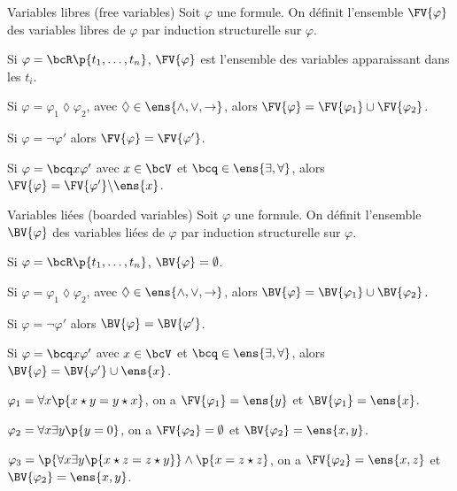     \begin{definition}{Variables libres (free variables)}{}
        Soit $\varphi$ une formule. On définit l'ensemble $\FV{\varphi}$ des variables libres de $\varphi$ par induction structurelle sur $\varphi$.
        
        \begin{enumerate}
            \itast Si $\varphi = \bcR\p{t_1, \dots, t_n}$, $\FV{\varphi}$ est l'ensemble des variables apparaissant dans les $t_i$.
            
            \itast Si $\varphi = \varphi_1 \lozenge \varphi_2$, avec $\lozenge \in \ens{\land, \lor, \rightarrow}$, alors $\FV{\varphi} = \FV{\varphi_1} \cup \FV{\varphi_2}$.
            
            \itast Si $\varphi = \neg \varphi'$ alors $\FV{\varphi} = \FV{\varphi'}$.
            
            \itast Si $\varphi = \bcq x \varphi'$ avec $x \in \bcV$ et $\bcq \in \ens{\exists, \forall}$, alors $\FV{\varphi} = \FV{\varphi'} \backslash \ens{x}$. 
        \end{enumerate}
    \end{definition}
    
        \begin{definition}{Variables liées (boarded variables)}{}
        Soit $\varphi$ une formule. On définit l'ensemble $\BV{\varphi}$ des variables liées de $\varphi$ par induction structurelle sur $\varphi$.
        
        \begin{enumerate}
            \itast Si $\varphi = \bcR\p{t_1, \dots, t_n}$, $\BV{\varphi} = \emptyset$.
            
            \itast Si $\varphi = \varphi_1 \lozenge \varphi_2$, avec $\lozenge \in \ens{\land, \lor, \rightarrow}$, alors $\BV{\varphi} = \BV{\varphi_1} \cup \BV{\varphi_2}$.
            
            \itast Si $\varphi = \neg \varphi'$ alors $\BV{\varphi} = \BV{\varphi'}$.
            
            \itast Si $\varphi = \bcq x \varphi'$ avec $x \in \bcV$ et $\bcq \in \ens{\exists, \forall}$, alors $\BV{\varphi} = \BV{\varphi'} \cup \ens{x}$. 
        \end{enumerate}
    \end{definition}
    
    \begin{example}{}{}
        \begin{enumerate}
            \itt $\varphi_1 = \forall x \p{x \star y = y \star x}$, on a $\FV{\varphi_1} = \ens{y}$ et $\BV{\varphi_1} = \ens{x}$.
            
            \itt $\varphi_2 = \forall x \exists y \p{y = 0}$, on a $\FV{\varphi_2} = \emptyset$ et $\BV{\varphi_2} = \ens{x, y}$.
            
            \itt $\varphi_3 = \p{\forall x \exists y \p{x \star z = z \star y}} \land \p{x = z \star z}$, on a $\FV{\varphi_2} = \ens{x, z}$ et $\BV{\varphi_2} = \ens{x, y}$.
        \end{enumerate}
    \end{example}
    
